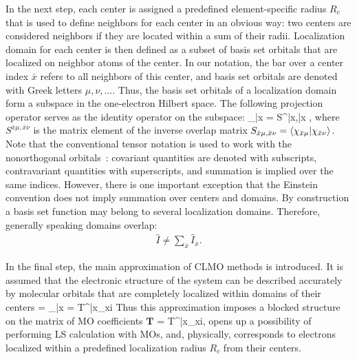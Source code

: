 \documentclass[aps,prl,twocolumn,reprint,amsmath,amssymb]{revtex4-1}
\begin{document}
In the next step, each center is assigned a predefined element-specific radius $R_c$ that is used to define neighbors for each center in an obvious way: two centers are considered neighbors if they are located within a sum of their radii. Localization domain for each center is then defined as a subset of basis set orbitals  that are localized on neighbor atoms of the center. In our notation, the bar over a center index $\bar{x}$ refers to all neighbors of this center, and basis set orbitals are denoted with Greek letters $\mu,\nu,\ldots$. Thus, the basis set orbitals of a localization domain form a subspace in the one-electron Hilbert space. The following projection operator serves as the identity operator on the subspace:
%
\bea
{}_{\bar{x}} =  S^{\bar{x}\mu,\bar{x}\nu} ,
\eea
%
where $S^{\bar{x}\mu,\bar{x}\nu}$ is the matrix element of the inverse overlap matrix $S_{\bar{x}\mu,\bar{x}\nu} = \langle  \chi_{\bar{x}\mu} \vert  \chi_{\bar{x}\nu} \rangle $. Note that the conventional tensor notation is used to work with the nonorthogonal orbitals~\cite{RZK-tensor}: covariant quantities are denoted with subscripts, contravariant quantities with superscripts, and summation is implied over the same indices. However, there is one important exception that the Einstein convention does not imply summation over centers and domains. 
%
By construction a basis set function may belong to several localization domains. Therefore, generally speaking domains overlap:
%
\begin{eqnarray}
\label{eq:span}
\hat{I} \neq \sum_{\bar{x}} \hat{I}_{\bar{x}}.
\end{eqnarray}

In the final step, the main approximation of CLMO methods is introduced. It is assumed that the electronic structure of the system can be described accurately by molecular orbitals that are completely localized within domains of their centers
%
\bea
{} = _{\bar{x}}  =  {T^{\bar{x}\mu}}_{xi}
\label{eq:LMO}
\eea
%
Thus this approximation imposes a blocked structure on the matrix of MO coefficients $\mathbf{T}$
%
\bea
{} =  {T^{\bar{x}\mu}}_{xi},
\label{eq:LMO}
\eea
%
opens up a possibility of performing LS calculation with MOs, and, physically, corresponds to electrons localized within a predefined localization radius $R_c$ from their centers.
\end{document}
